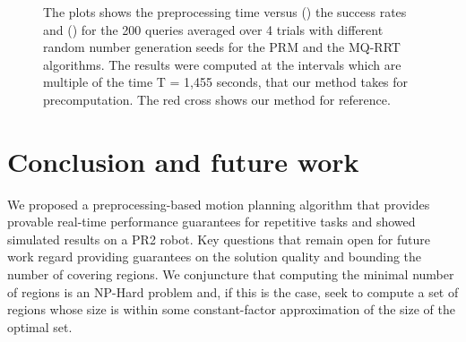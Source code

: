 \documentclass[letterpaper]{article} %
\begin{document}
\begin{figure}
\begin{subfigure}[b]{0.45\textwidth}
        \caption{}
        \label{fig:memory}
    \end{subfigure}
    \caption{The plots shows the preprocessing time versus () the success rates and () for the 200 queries averaged over 4 trials with different random number generation seeds for the PRM and the MQ-RRT algorithms. The results were computed at the intervals which are multiple of the time T = 1,455 seconds, that our method takes for precomputation. The red cross shows our method for reference.}
    \label{fig:plots}
\end{figure}


\section{Conclusion and future work}
We proposed a preprocessing-based motion planning algorithm that provides provable real-time performance guarantees for repetitive tasks and showed simulated results on a PR2 robot. 
Key questions that remain open for future work regard providing guarantees on the solution quality and bounding the number of covering regions.
We conjuncture that computing the minimal number of regions is an \textsf{NP-Hard} problem and, if this is the case, seek to compute a set of regions whose size is within some constant-factor approximation of  the size of the optimal set.


\end{document}
